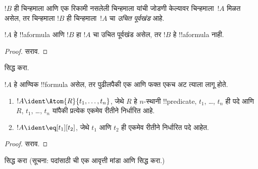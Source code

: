 \documentclass[../../../include/open-logic-section]{subfiles}
\begin{document}
\begin{defn}[उचित पूर्वखंड]
$!B$ ही चिन्हमाला आणि एक रिकामी नसलेली चिन्हमाला यांची जोडणी केल्यावर
चिन्हमाला~$!A$ मिळत असेल, तर चिन्हमाला $!B$ ही चिन्हमाला~$!A$ चा
\emph{उचित पूर्वखंड} आहे.
\end{defn}

\begin{lem}
$!A$ हे !!a{formula} आणि $!B$ हा $!A$ चा उचित पूर्वखंड असेल, तर $!B$
हे !!a{formula} नाही.
\end{lem}

\begin{proof}
सराव.
\end{proof}

\begin{prob}
 सिद्ध करा.
\end{prob}

\begin{prop}
$!A$ हे आण्विक !!{formula} असेल, तर पुढीलपैकी एक आणि फक्त एकच अट त्याला
लागू होते.
\begin{enumerate}
\item $!A \ident \Atom{R}{t_1,\dots,t_n}$, जेथे $R$ हे $n$-स्थानी
  !!{predicate}, $t_1$, \dots, $t_n$ ही पदे आणि $R$, $t_1$, \dots,
  $t_n$ यांपैकी प्रत्येक एकमेव रीतीने निर्धारित आहे.
\item $!A \ident \eq[t_1][t_2]$, जेथे $t_1$ आणि $t_2$ ही एकमेव रीतीने
  निर्धारित पदे आहेत.
\end{enumerate}
\end{prop}

\begin{proof}
सराव.
\end{proof}

\begin{prob}
 सिद्ध करा (सूचना: पदांसाठी
 ची एक आवृत्ती मांडा आणि सिद्ध करा.)
\end{prob}
\end{document}
